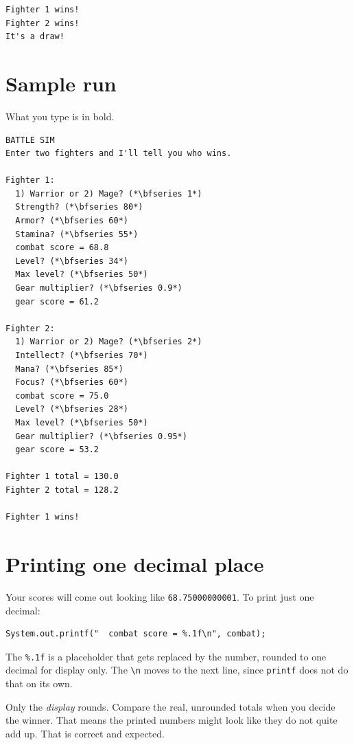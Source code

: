 \documentclass[11pt]{article}
\newcommand{\code}[1]{\texttt{#1}}
\begin{document}
\begin{lstlisting}[style=term]
Fighter 1 wins!
Fighter 2 wins!
It's a draw!
\end{lstlisting}

\section{Sample run}

What you type is in bold.

\begin{lstlisting}[style=term]
BATTLE SIM
Enter two fighters and I'll tell you who wins.

Fighter 1:
  1) Warrior or 2) Mage? (*\bfseries 1*)
  Strength? (*\bfseries 80*)
  Armor? (*\bfseries 60*)
  Stamina? (*\bfseries 55*)
  combat score = 68.8
  Level? (*\bfseries 34*)
  Max level? (*\bfseries 50*)
  Gear multiplier? (*\bfseries 0.9*)
  gear score = 61.2

Fighter 2:
  1) Warrior or 2) Mage? (*\bfseries 2*)
  Intellect? (*\bfseries 70*)
  Mana? (*\bfseries 85*)
  Focus? (*\bfseries 60*)
  combat score = 75.0
  Level? (*\bfseries 28*)
  Max level? (*\bfseries 50*)
  Gear multiplier? (*\bfseries 0.95*)
  gear score = 53.2

Fighter 1 total = 130.0
Fighter 2 total = 128.2

Fighter 1 wins!
\end{lstlisting}

\section{Printing one decimal place}

Your scores will come out looking like \code{68.75000000001}. To print just one decimal:

\begin{lstlisting}
System.out.printf("  combat score = %.1f\n", combat);
\end{lstlisting}

The \code{\%.1f} is a placeholder that gets replaced by the number, rounded to one decimal for display only. The \code{\textbackslash n} moves to the next line, since \code{printf} does not do that on its own.

\begin{note}[bronze]
Only the \emph{display} rounds. Compare the real, unrounded totals when you decide the winner. That means the printed numbers might look like they do not quite add up. That is correct and expected.
\end{note}
\end{document}
